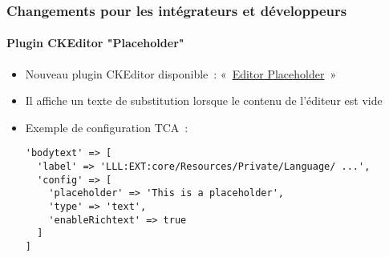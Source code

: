 %

\begin{frame}[fragile]
	\frametitle{Changements pour les intégrateurs et développeurs}
	\framesubtitle{Plugin CKEditor "Placeholder"}

	\lstset{basicstyle=\tiny\ttfamily}

	\begin{itemize}
		\item Nouveau plugin CKEditor disponible~:
			«~\href{https://ckeditor.com/docs/ckeditor4/latest/examples/editorplaceholder.html}{Editor Placeholder}~»
		\item Il affiche un texte de substitution lorsque le contenu de l'éditeur est vide
		\item Exemple de configuration TCA~:
\begin{lstlisting}
'bodytext' => [
  'label' => 'LLL:EXT:core/Resources/Private/Language/ ...',
  'config' => [
    'placeholder' => 'This is a placeholder',
    'type' => 'text',
    'enableRichtext' => true
  ]
]
\end{lstlisting}

	\end{itemize}

\end{frame}

